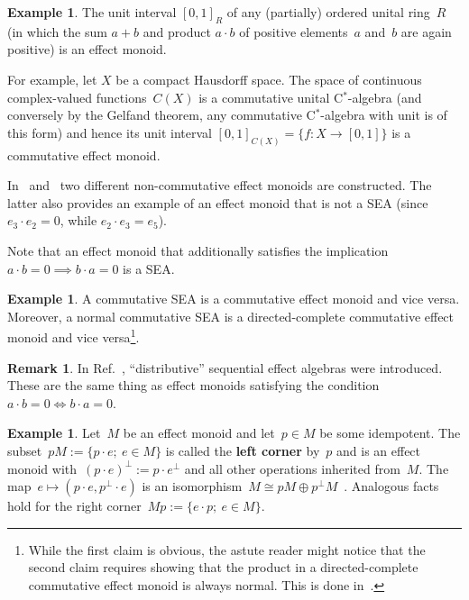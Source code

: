 \documentclass[a4paper, onecolumn, accepted=2020-12-22]{quantumarticle}
\newcommand\Define[1]{\textbf{#1}}
\newcounter{counter}
\theoremstyle{definition}
\newtheorem{example}[counter]{Example}
\newtheorem{remark}[counter]{Remark}
\begin{document}
\begin{example}\label{ex:CX}
    The unit interval $[0,1]_R$ of any (partially)
    ordered unital ring~$R$
    (in which the sum $a+b$ and product $a\cdot b$
    of positive elements~$a$ and~$b$ are again positive)
    is an effect monoid.

    For example, let $X$ be a compact Hausdorff space.
    The space of continuous complex-valued functions~$C(X)$
    is a commutative unital C$^*$-algebra
    (and conversely by the Gelfand theorem, any
    commutative C$^*$-algebra with unit is of this form) and hence its
    unit interval $[0,1]_{C(X)} = \{f:X\rightarrow [0,1]\}$ is a
    commutative effect monoid.

    In~\cite[Ex.~4.3.9]{kentathesis} and~\cite[Cor.~51]{basmaster}
        two different non-commutative effect monoids are constructed.
The latter also provides an example
of an effect monoid that is not a SEA
    (since $e_3 \cdot e_2=0$, while $e_2\cdot e_3=e_5$).
\end{example}

Note that an effect monoid that additionally satisfies the implication
$a\cdot b=0\implies b\cdot a = 0$
is a SEA.

\begin{example}\label{prop:commutativemonoidissequential}
	A commutative SEA is a commutative effect monoid and vice versa.
    Moreover, a normal commutative SEA is a directed-complete commutative effect monoid and vice versa\footnote{While the first claim is obvious, the astute reader might notice that the second claim requires showing that the product in a directed-complete commutative effect monoid is always normal. This is done in~\cite[Theorem~43]{first}.}.
\end{example}

\begin{remark}
	In Ref.~\cite{habil2008tensor}, ``distributive'' sequential effect algebras were introduced. These are the same thing as effect monoids satisfying the condition $a\cdot b = 0 \iff b\cdot a = 0$.
\end{remark}

\begin{example}\label{cornersexample}
    Let~$M$ be an effect monoid and let~$p \in M$ be some idempotent.
    The subset~$pM := \{p \cdot e; \ e\in M\}$
        is called the \Define{left corner} by~$p$
        and is an effect monoid with~$(p\cdot e)^\perp := p \cdot e^\perp$
            and all other operations inherited from~$M$.
        The map~$e \mapsto (p\cdot e, p^\perp \cdot e)$
        is an isomorphism~$M \cong p M \oplus
            p^\perp M$~\cite[Corollary~21]{first}.
Analogous facts hold for the right corner~$Mp := \{e \cdot p; \ e\in M\}$.
\end{example}
\end{document}
